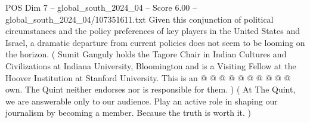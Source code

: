 \begin{textsample}{POS Dim 7 – global\_south\_2024\_04 – Score 6.00 – global\_south\_2024\_04/107351611.txt}
Given this conjunction of political circumstances and the policy preferences of key players in the United States and Israel, a dramatic departure from current policies does not seem to be looming on the horizon. ( Sumit Ganguly holds the Tagore Chair in Indian Cultures and Civilizations at Indiana University, Bloomington and is a Visiting Fellow at the Hoover Institution at Stanford University.
This is an @ @ @ @ @ @ @ @ @ @ own.
The Quint neither endorses nor is responsible for them. ) ( At The Quint, we are answerable only to our audience.
Play an active role in shaping our journalism by becoming a member.
Because the truth is worth it. )

\end{textsample}
